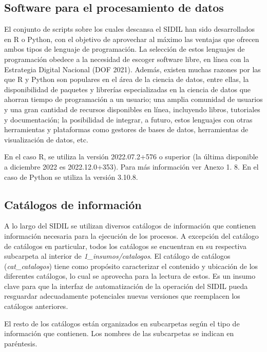 \documentclass[
]{article}
\begin{document}
\hypertarget{software-para-el-procesamiento-de-datos}{%
\subsection{Software para el procesamiento de datos}\label{software-para-el-procesamiento-de-datos}}

El conjunto de scripts sobre los cuales descansa el SIDIL han sido desarrollados en R o Python, con el objetivo de aprovechar al máximo las ventajas que ofrecen ambos tipos de lenguaje de programación. La selección de estos lenguajes de programación obedece a la necesidad de escoger software libre, en línea con la Estrategia Digital Nacional (DOF 2021). Además, existen muchas razones por las que R y Python son populares en el área de la ciencia de datos, entre ellas, la disponibilidad de paquetes y librerías especializadas en la ciencia de datos que ahorran tiempo de programación a un usuario; una amplia comunidad de usuarios y una gran cantidad de recursos disponibles en línea, incluyendo libros, tutoriales y documentación; la posibilidad de integrar, a futuro, estos lenguajes con otras herramientas y plataformas como gestores de bases de datos, herramientas de visualización de datos, etc.

En el caso R, se utiliza la versión 2022.07.2+576 o superior (la última disponible a diciembre 2022 es 2022.12.0+353). Para más información ver Anexo 1. 8. En el caso de Python se utiliza la versión 3.10.8.

\hypertarget{catalogos}{%
\subsection{Catálogos de información}\label{catalogos}}

A lo largo del SIDIL se utilizan diversos catálogos de información que contienen información necesaria para la ejecución de los procesos. A excepción del catálogo de catálogos en particular, todos los catálogos se encuentran en su respectiva subcarpeta al interior de \emph{1\_insumos/catalogos}. El catálogo de catálogos (\emph{cat\_catalogos}) tiene como propósito caracterizar el contenido y ubicación de los diferentes catálogos, lo cual se aprovecha para la lectura de estos. Es un insumo clave para que la interfaz de automatización de la operación del SIDIL pueda resguardar adecuadamente potenciales nuevas versiones que reemplacen los catálogos anteriores.

El resto de los catálogos están organizados en subcarpetas según el tipo de información que contienen. Los nombres de las subcarpetas se indican en paréntesis.
\end{document}
